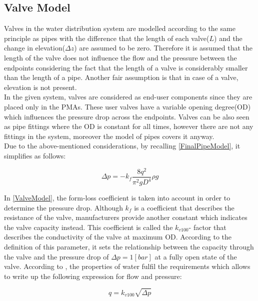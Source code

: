 \subsection{Valve Model}  
\label{ValveModel}


Valves in the water distribution system are modelled according to the same principle as pipes with the difference that the length of each valve($L$) and the change in elevation($\Delta z$) are assumed to be zero. Therefore it is assumed that the length of the valve does not influence the flow and the pressure between the endpoints considering the fact that the length of a valve is considerably smaller than the length of a pipe. Another fair assumption is that in case of a valve, elevation is not present. \\
In the given system, valves are considered as end-user components since they are placed only in the PMAs. These user valves have a variable opening degree(OD) which influences the pressure drop across the endpoints. Valves can be also seen as pipe fittings where the OD is constant for all times, however there are not any fittings in the system, moreover the model of pipes covers it anyway. \\
Due to the above-mentioned considerations, by recalling \eqref{FinalPipeModel}, it simplifies as follows: 

\begin{equation}
\label{ValveModel}
 \Delta p =  - k_f \frac{8q^2}{\pi^2gD^4} \rho g 
\end{equation}

In \eqref{ValveModel}, the form-loss coefficient is taken into account in order to determine the pressure drop. Although $k_f$ is a coefficient that describes the resistance of the valve, manufacturers provide another constant which indicates the valve capacity instead. This coefficient is called the $k_{v100}$- factor that describes the conductivity of the valve at maximum OD. According to the definition of this parameter, it sets the relationship between the capacity through the valve and the pressure drop of $\Delta p = 1 [bar]$ at a fully open state of the valve. According to \cite{kvvalve}, the properties of water fulfil the requirements which allows to write up the following expression for flow and pressure: 

\begin{equation}
\label{kvequation}
 q =  k_{v100} \sqrt{\Delta p} 
\end{equation}

